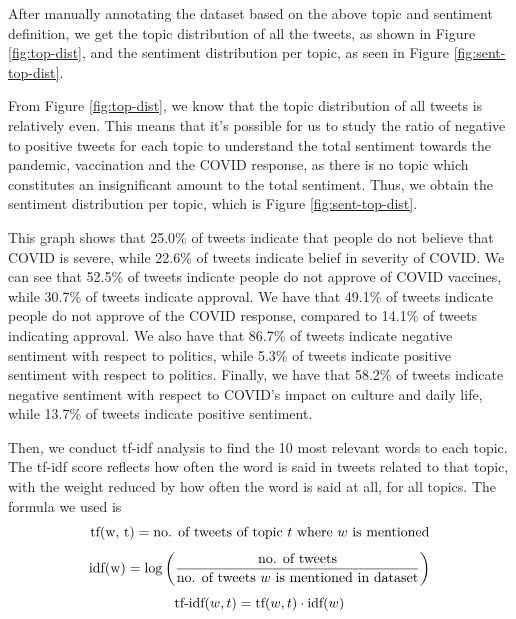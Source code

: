 \documentclass[letterpaper]{article} %
\begin{document}
After manually annotating the dataset based on the above topic and sentiment definition, we get the topic distribution of all the tweets, as shown in Figure \ref{fig:top-dist}, and the sentiment distribution per topic, as seen in Figure \ref{fig:sent-top-dist}. \par
From Figure \ref{fig:top-dist}, we know that the topic distribution of all tweets is relatively even. This means that it's possible for us to study the ratio of negative to positive tweets for each topic to understand the total sentiment towards the pandemic, vaccination and the COVID response, as there is no topic which constitutes an insignificant amount to the total sentiment. Thus, we obtain the sentiment distribution per topic, which is Figure \ref{fig:sent-top-dist}. \par
This graph shows that 25.0\% of tweets indicate that people do not believe that COVID is severe, while 22.6\% of tweets indicate belief in severity of COVID. We can see that 52.5\% of tweets indicate people do not approve of COVID vaccines, while 30.7\% of tweets indicate approval. We have that 49.1\% of tweets indicate people do not approve of the COVID response, compared to 14.1\% of tweets indicating approval. We also have that 86.7\% of tweets indicate negative sentiment with respect to politics, while 5.3\% of tweets indicate positive sentiment with respect to politics. Finally, we have that 58.2\% of tweets indicate negative sentiment with respect to COVID's impact on culture and daily life, while 13.7\% of tweets indicate positive sentiment.
\par
Then, we conduct tf-idf analysis to find the 10 most relevant words to each topic. The tf-idf score reflects how often the word is said in tweets related to that topic, with the weight reduced by how often the word is said at all, for all topics. The formula we used is
$$\textnormal{tf(w, t)} = \textnormal{no. of tweets of topic $t$ where $w$ is mentioned}$$
$$\textnormal{idf(w}) = \log\left(\frac{\textnormal{no. of tweets}}{\textnormal{no. of tweets $w$ is mentioned in dataset}}\right)$$
$$\textnormal{tf-idf}(w, t) = \textnormal{tf}(w,t) \cdot \textnormal{idf}(w)$$
\end{document}
